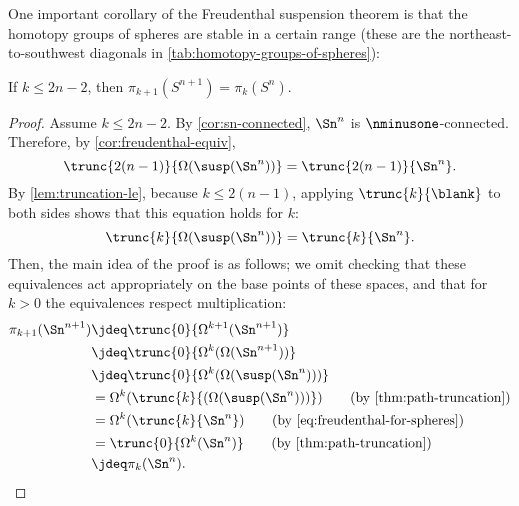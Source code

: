{%

%
%

%
%
%
One important corollary of the Freudenthal suspension theorem is that the homotopy groups of
spheres are stable in a certain range (these are the northeast-to-southwest diagonals
in \cref{tab:homotopy-groups-of-spheres}):

\begin{cor} \label{cor:stability-spheres}
If $k \le 2n-2$, then $\pi_{k+1}(S^{n+1}) = \pi_{k}(S^{n})$.
\end{cor}
\begin{proof}
Assume $k \le 2n-2$.
%
By \cref{cor:sn-connected}, $\Sn ^{n}$ is $\nminusone$-connected.  Therefore,
by \cref{cor:freudenthal-equiv},
\[
\trunc{2(n-1)}{\Omega(\susp(\Sn^{n}))} = \trunc{2(n-1)}{\Sn^{n}}.
\]
By \cref{lem:truncation-le}, because $k \le 2(n-1)$, applying $\trunc{k}{\blank}$
to both sides shows that this equation holds for $k$:
\begin{equation}\label{eq:freudenthal-for-spheres}
\trunc{k}{\Omega(\susp(\Sn^{n}))} = \trunc{k}{\Sn^{n}}.
\end{equation}
%
Then, the main idea of the proof is as follows; we omit checking that these
equivalences act appropriately on the base points of these spaces, and that for
$k > 0$ the equivalences respect multiplication:
%
\begin{align*}
\pi_{k+1}(\Sn^{n+1}) &\jdeq \trunc{0}{\Omega^{k+1}(\Sn^{n+1})} \\
                     &\jdeq \trunc{0}{\Omega^k(\Omega(\Sn^{n+1}))} \\
                     &\jdeq \trunc{0}{\Omega^k(\Omega(\susp(\Sn^{n})))} \\
                     &= \Omega^k(\trunc{k}{(\Omega(\susp(\Sn^{n})))})
                     \tag{by \cref{thm:path-truncation}}\\
                     &= \Omega^k(\trunc{k}{\Sn^{n}})
                     \tag{by \eqref{eq:freudenthal-for-spheres}}\\
                     &= \trunc{0}{\Omega^k(\Sn^{n})}
                     \tag{by \cref{thm:path-truncation}}\\
                     &\jdeq \pi_k(\Sn^{n}). \qedhere
\end{align*}
%
\end{proof}

}

